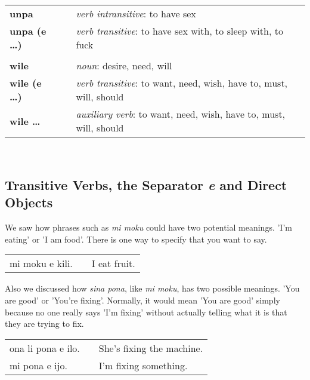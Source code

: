 \begin{supertabular}{p{2,5cm}|ll}
\textbf{unpa} && \textit{verb intransitive}: to have sex \\ %
\textbf{unpa (e \dots)} && \textit{verb transitive}: to have sex with, to sleep with, to fuck \\ %
 && \\ %
%
\textbf{wile} && \textit{noun}: desire, need, will \\ %
\textbf{wile (e \dots)} && \textit{verb transitive}: to want, need, wish, have to, must, will, should \\ %
\textbf{wile \dots} && \textit{auxiliary verb}: to want, need, wish, have to, must, will, should \\ %
\end{supertabular} \\
%
\newpage
\subsection*{Transitive Verbs, the Separator \textit{e} and Direct Objects}
%
We saw how phrases such as \textit{mi moku} could have two potential meanings. 
'I'm eating' or 'I am food'. 
There is one way to specify that you want to say. 

\begin{supertabular}{p{5,5cm}|ll}
mi moku e kili. && I eat fruit. \\
\end{supertabular} 

Also we discussed how \textit{sina pona}, like \textit{mi moku}, has two possible meanings. 
'You are good' or 'You're fixing'. 
Normally, it would mean 'You are good' simply because no one really says 'I'm fixing' without actually telling what it is that they are trying to fix. 

\begin{supertabular}{p{5,5cm}|ll}
ona li pona e ilo. && She's fixing the machine. \\
mi pona e ijo. && I'm fixing something. \\
\end{supertabular} 

